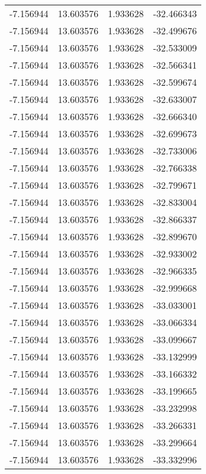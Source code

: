 \begin{tabular}{rrrr}
       -7.156944 &        13.603576 &    1.933628 & -32.466343 \\
       -7.156944 &        13.603576 &    1.933628 & -32.499676 \\
       -7.156944 &        13.603576 &    1.933628 & -32.533009 \\
       -7.156944 &        13.603576 &    1.933628 & -32.566341 \\
       -7.156944 &        13.603576 &    1.933628 & -32.599674 \\
       -7.156944 &        13.603576 &    1.933628 & -32.633007 \\
       -7.156944 &        13.603576 &    1.933628 & -32.666340 \\
       -7.156944 &        13.603576 &    1.933628 & -32.699673 \\
       -7.156944 &        13.603576 &    1.933628 & -32.733006 \\
       -7.156944 &        13.603576 &    1.933628 & -32.766338 \\
       -7.156944 &        13.603576 &    1.933628 & -32.799671 \\
       -7.156944 &        13.603576 &    1.933628 & -32.833004 \\
       -7.156944 &        13.603576 &    1.933628 & -32.866337 \\
       -7.156944 &        13.603576 &    1.933628 & -32.899670 \\
       -7.156944 &        13.603576 &    1.933628 & -32.933002 \\
       -7.156944 &        13.603576 &    1.933628 & -32.966335 \\
       -7.156944 &        13.603576 &    1.933628 & -32.999668 \\
       -7.156944 &        13.603576 &    1.933628 & -33.033001 \\
       -7.156944 &        13.603576 &    1.933628 & -33.066334 \\
       -7.156944 &        13.603576 &    1.933628 & -33.099667 \\
       -7.156944 &        13.603576 &    1.933628 & -33.132999 \\
       -7.156944 &        13.603576 &    1.933628 & -33.166332 \\
       -7.156944 &        13.603576 &    1.933628 & -33.199665 \\
       -7.156944 &        13.603576 &    1.933628 & -33.232998 \\
       -7.156944 &        13.603576 &    1.933628 & -33.266331 \\
       -7.156944 &        13.603576 &    1.933628 & -33.299664 \\
       -7.156944 &        13.603576 &    1.933628 & -33.332996 \\
\bottomrule
\end{tabular}
